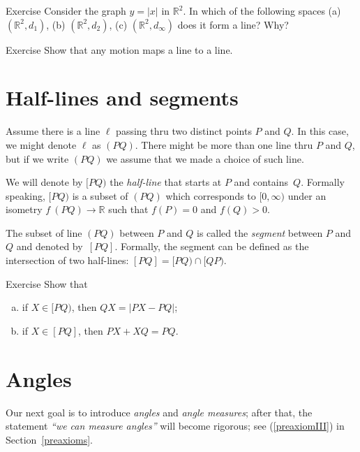 \begin{thm}{Exercise}\label{ex:y=|x|}
Consider the graph $y=|x|$ in $\mathbb{R}^2$.
In which of the following spaces 
(a) $(\mathbb{R}^2,d_1)$, 
(b) $(\mathbb{R}^2,d_2)$, 
(c) $(\mathbb{R}^2,d_\infty)$ 
does it form a line? 
Why?
\end{thm}

\begin{thm}{Exercise}\label{ex:line-motion}
Show that any motion maps a line to a line. 
\end{thm}

\section{Half-lines and segments}

Assume there is a line $\ell$ passing thru
two distinct points $P$ and $Q$.
In this case, we might denote $\ell$ as $(PQ)$.
There might be more than one line thru $P$ and $Q$,
but if we write \index{60@$(PQ)$, $[PQ)$, $[PQ]$}$(PQ)$ we assume that we made a choice of such line. 

We will denote by $[P Q)$ the \emph{half-line}
that starts at $P$ and contains~$Q$. 
Formally speaking, $[P Q)$ is a subset of $(P Q)$ which corresponds to $[0,\infty)$ under an isometry $f\:(P Q)\to \mathbb{R}$ such that $f(P)=0$ and $f(Q)>0$.

The subset of line $(P Q)$ between $P$ and $Q$ is called the \emph{segment} between $P$ and $Q$ and denoted by~$[P Q]$.
Formally, the segment can be defined as the intersection of two half-lines: $[P Q]=[P Q)\cap[Q P)$.

\begin{thm}{Exercise}\label{ex:trig==}
Show that 
\begin{enumerate}[(a)]
\item if $X\in [PQ)$, then 
$QX=|PX-PQ|$;
\item if $X\in [PQ]$, then 
$PX+XQ=PQ$.
\end{enumerate}

\end{thm}


\section{Angles}

Our next goal is to introduce {}\emph{angles} and {}\emph{angle measures}; 
after that, the statement \textit{``we can measure angles''} will become rigorous;
see (\ref{preaxiomIII}) in Section~\ref{preaxioms}.

